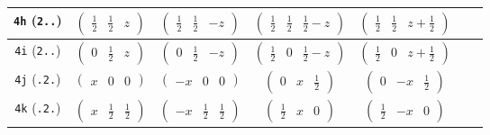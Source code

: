 \documentclass[fleqn,9pt,landscape]{jsarticle}
\begin{document}
\begin{center}
\begin{longtable}{ccccccc}
{\tt 4h} ({\tt 2..}) & $ \begin{pmatrix} \frac{1}{2} & \frac{1}{2} & z \end{pmatrix} $ & $ \begin{pmatrix} \frac{1}{2} & \frac{1}{2} & - z \end{pmatrix} $ & $ \begin{pmatrix} \frac{1}{2} & \frac{1}{2} & \frac{1}{2} - z \end{pmatrix} $ & $ \begin{pmatrix} \frac{1}{2} & \frac{1}{2} & z + \frac{1}{2} \end{pmatrix} $ & $  $ & $  $ \\ \hline
{\tt 4i} ({\tt 2..}) & $ \begin{pmatrix} 0 & \frac{1}{2} & z \end{pmatrix} $ & $ \begin{pmatrix} 0 & \frac{1}{2} & - z \end{pmatrix} $ & $ \begin{pmatrix} \frac{1}{2} & 0 & \frac{1}{2} - z \end{pmatrix} $ & $ \begin{pmatrix} \frac{1}{2} & 0 & z + \frac{1}{2} \end{pmatrix} $ & $  $ & $  $ \\ \hline
{\tt 4j} ({\tt .2.}) & $ \begin{pmatrix} x & 0 & 0 \end{pmatrix} $ & $ \begin{pmatrix} - x & 0 & 0 \end{pmatrix} $ & $ \begin{pmatrix} 0 & x & \frac{1}{2} \end{pmatrix} $ & $ \begin{pmatrix} 0 & - x & \frac{1}{2} \end{pmatrix} $ & $  $ & $  $ \\ \hline
{\tt 4k} ({\tt .2.}) & $ \begin{pmatrix} x & \frac{1}{2} & \frac{1}{2} \end{pmatrix} $ & $ \begin{pmatrix} - x & \frac{1}{2} & \frac{1}{2} \end{pmatrix} $ & $ \begin{pmatrix} \frac{1}{2} & x & 0 \end{pmatrix} $ & $ \begin{pmatrix} \frac{1}{2} & - x & 0 \end{pmatrix} $ & $  $ & $  $ \\ \hline

\end{longtable}
\end{center}
\end{document}
